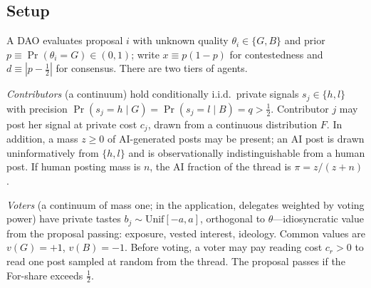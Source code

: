 \documentclass[12pt]{article}
\begin{document}
\subsection{Setup}
\label{sec:setup}

A DAO evaluates proposal $i$ with unknown quality $\theta_i \in \{G, B\}$ and prior $p \equiv \Pr(\theta_i = G) \in (0,1)$; write $x \equiv p(1-p)$ for contestedness and $d \equiv |p - \tfrac12|$ for consensus. There are two tiers of agents.

\emph{Contributors} (a continuum) hold conditionally i.i.d.\ private signals $s_j \in \{h, l\}$ with precision $\Pr(s_j = h \mid G) = \Pr(s_j = l \mid B) = q > \tfrac12$. Contributor $j$ may post her signal at private cost $c_j$, drawn from a continuous distribution $F$. In addition, a mass $z \ge 0$ of AI-generated posts may be present; an AI post is drawn uninformatively from $\{h,l\}$ and is observationally indistinguishable from a human post. If human posting mass is $n$, the AI fraction of the thread is $\pi = z/(z+n)$.

\emph{Voters} (a continuum of mass one; in the application, delegates weighted by voting power) have private tastes $b_j \sim \mathrm{Unif}[-a, a]$, orthogonal to $\theta$---idiosyncratic value from the proposal passing: exposure, vested interest, ideology. Common values are $v(G) = +1$, $v(B) = -1$. Before voting, a voter may pay reading cost $c_r > 0$ to read one post sampled at random from the thread. The proposal passes if the For-share exceeds $\tfrac12$.
\end{document}
